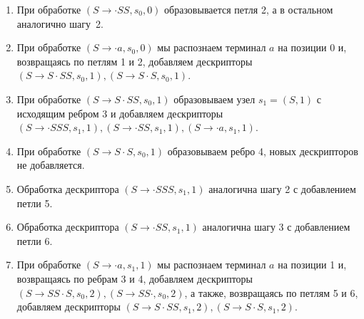 \begin{example}
\begin{enumerate}
    \item При обработке $ (S \to \cdot S S, s_0, 0) $ образовывается петля 2, а в остальном аналогично \mbox{шагу 2.}

    \begin{center}
      
    \end{center}

    \item При обработке $ (S \to \cdot a, s_0, 0) $ мы распознаем терминал $a$ на позиции 0 и, возвращаясь по петлям 1 и 2, добавляем дескрипторы $ (S \to S \cdot S S, s_0, 1), (S \to S \cdot S, s_0, 1) $.

    \item При обработке $ (S \to S \cdot S S, s_0, 1) $ образовываем узел $s_1 = (S, 1)$ с исходящим ребром 3 и добавляем дескрипторы $ (S \to \cdot SSS, s_1, 1), (S \to \cdot SS, s_1, 1), (S \to \cdot a, s_1, 1) $.

    \begin{center}
      
    \end{center}

    \item При обработке $ (S \to S \cdot S, s_0, 1) $ образовываем ребро 4, новых дескрипторов не добавляется.

    \begin{center}
      
    \end{center}

    \item Обработка дескриптора $ (S \to \cdot S S S, s_1, 1) $ аналогична шагу 2 с добавлением петли 5.

    \begin{center}
      
    \end{center}

    \item Обработка дескриптора $ (S \to \cdot S S, s_1, 1) $ аналогична шагу 3 с добавлением петли 6.

    \begin{center}
      
    \end{center}

    \item При обработке $ (S \to \cdot a, s_1, 1) $ мы распознаем терминал $a$ на позиции 1 и, возвращаясь по ребрам 3 и 4, добавляем дескрипторы $ (S \to S S \cdot S, s_0, 2), (S \to S S \cdot, s_0, 2) $, а также, возвращаясь по петлям 5 и 6, добавляем дескрипторы $ (S \to S \cdot S S, s_1, 2), (S \to S \cdot S, s_1, 2) $.


\end{enumerate}
\end{example}

